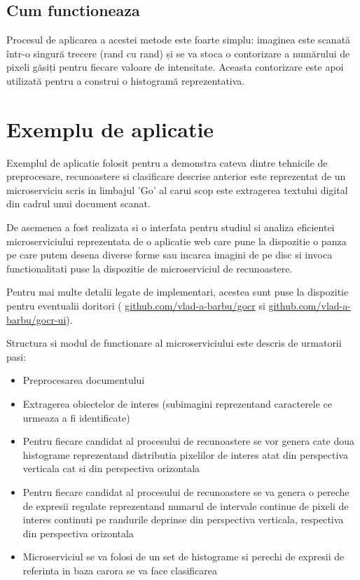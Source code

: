 \documentclass[10pt]{article}
\begin{document}
\subsection{Cum functioneaza}

\> Procesul de aplicarea a acestei metode este foarte simplu:
imaginea este scanată într-o singură trecere (rand cu rand) și se va stoca o contorizare a numărului de pixeli găsiți pentru fiecare valoare de intensitate.
Aceasta contorizare este apoi utilizată pentru a construi o histogramă reprezentativa.

\newpage

\section{Exemplu de aplicatie}

\> Exemplul de aplicatie folosit pentru a demonstra cateva dintre tehnicile de preprocesare, recunoastere si clasificare
descrise anterior este reprezentat de un microserviciu scris in limbajul 'Go' al carui scop este extragerea textului digital din cadrul
unui document scanat.

\> De asemenea a fost realizata si o interfata pentru studiul si analiza eficientei microserviciului reprezentata de
o aplicatie web care pune la dispozitie o panza pe care putem desena diverse forme sau incarca imagini de pe disc si 
invoca functionalitati puse la dispozitie de microserviciul de recunoastere. 

\> Pentru mai multe detalii legate de implementari, acestea sunt puse la dispozitie pentru eventualii doritori (
\href{https://github.com/vlad-a-barbu/gocr}{github.com/vlad-a-barbu/gocr} si \href{https://github.com/vlad-a-barbu/gocr-ui}{github.com/vlad-a-barbu/gocr-ui}).

\> Structura si modul de functionare al microserviciului este descris de urmatorii pasi:

\begin{itemize}

  \item Preprocesarea documentului 
  \item Extragerea obiectelor de interes (subimagini reprezentand caracterele ce urmeaza a fi identificate) 
  \item Pentru fiecare candidat al procesului de recunoastere se vor genera cate doua histograme reprezentand
  distributia pixelilor de interes atat din perspectiva verticala cat si din perspectiva orizontala
  \item Pentru fiecare candidat al procesului de recunoastere se va genera o pereche de expresii regulate
  reprezentand numarul de intervale continue de pixeli de interes continuti pe randurile deprinse din perspectiva verticala,
  respectiva din perspectiva orizontala
  \item Microserviciul se va folosi de un set de histograme si perechi de expresii de referinta in baza carora se va face clasificarea
  
\end{itemize}
\end{document}
